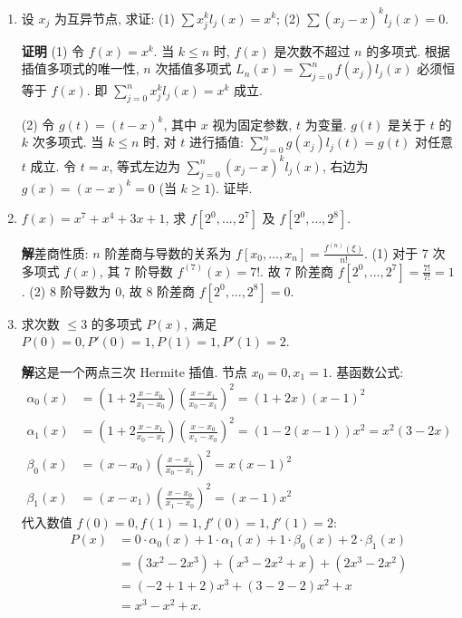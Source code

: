 \documentclass[a4paper,11pt]{ctexart}
\newcommand{\sol}{\par\noindent\textbf{解}\quad}
\newcommand{\proof}{\par\noindent\textbf{证明}\quad}
\begin{document}
\begin{enumerate}[label=\textbf{2-\arabic*.}, leftmargin=*]
    \item[4.] 设 $x_j$ 为互异节点, 求证: (1) $\sum x_j^k l_j(x) = x^k$; (2) $\sum (x_j-x)^k l_j(x) = 0$.
    
    \proof 
    (1) 令 $f(x) = x^k$. 当 $k \leqslant n$ 时, $f(x)$ 是次数不超过 $n$ 的多项式.
    根据插值多项式的唯一性, $n$ 次插值多项式 $L_n(x) = \sum_{j=0}^n f(x_j)l_j(x)$ 必须恒等于 $f(x)$.
    即 $\sum_{j=0}^n x_j^k l_j(x) = x^k$ 成立.
    
    (2) 令 $g(t) = (t-x)^k$, 其中 $x$ 视为固定参数, $t$ 为变量.
    $g(t)$ 是关于 $t$ 的 $k$ 次多项式. 当 $k \leqslant n$ 时, 对 $t$ 进行插值:
    $\sum_{j=0}^n g(x_j)l_j(t) = g(t)$ 对任意 $t$ 成立.
    令 $t=x$, 等式左边为 $\sum_{j=0}^n (x_j-x)^k l_j(x)$, 右边为 $g(x) = (x-x)^k = 0$ (当 $k \ge 1$). 证毕.

    \item[8.] $f(x) = x^7 + x^4 + 3x + 1$, 求 $f[2^0, \dots, 2^7]$ 及 $f[2^0, \dots, 2^8]$.
    
    \sol 差商性质: $n$ 阶差商与导数的关系为 $f[x_0, \dots, x_n] = \frac{f^{(n)}(\xi)}{n!}$.
    (1) 对于 7 次多项式 $f(x)$, 其 7 阶导数 $f^{(7)}(x) = 7!$.
    故 7 阶差商 $f[2^0, \dots, 2^7] = \frac{7!}{7!} = 1$.
    (2) 8 阶导数为 0, 故 8 阶差商 $f[2^0, \dots, 2^8] = 0$.

    \item[14.] 求次数 $\leqslant 3$ 的多项式 $P(x)$, 满足 $P(0)=0, P'(0)=1, P(1)=1, P'(1)=2$.
    
    \sol 这是一个两点三次 Hermite 插值. 节点 $x_0=0, x_1=1$.
    基函数公式:
    \begin{align*}
    \alpha_0(x) &= (1+2\frac{x-x_0}{x_1-x_0})\left(\frac{x-x_1}{x_0-x_1}\right)^2 = (1+2x)(x-1)^2 \\
    \alpha_1(x) &= (1+2\frac{x-x_1}{x_0-x_1})\left(\frac{x-x_0}{x_1-x_0}\right)^2 = (1-2(x-1))x^2 = x^2(3-2x) \\
    \beta_0(x) &= (x-x_0)\left(\frac{x-x_1}{x_0-x_1}\right)^2 = x(x-1)^2 \\
    \beta_1(x) &= (x-x_1)\left(\frac{x-x_0}{x_1-x_0}\right)^2 = (x-1)x^2
    \end{align*}
    代入数值 $f(0)=0, f(1)=1, f'(0)=1, f'(1)=2$:
    \begin{align*}
    P(x) &= 0 \cdot \alpha_0(x) + 1 \cdot \alpha_1(x) + 1 \cdot \beta_0(x) + 2 \cdot \beta_1(x) \\
         &= (3x^2-2x^3) + (x^3-2x^2+x) + (2x^3-2x^2) \\
         &= (-2+1+2)x^3 + (3-2-2)x^2 + x \\
         &= x^3 - x^2 + x.
    \end{align*}


\end{enumerate}
\end{document}
